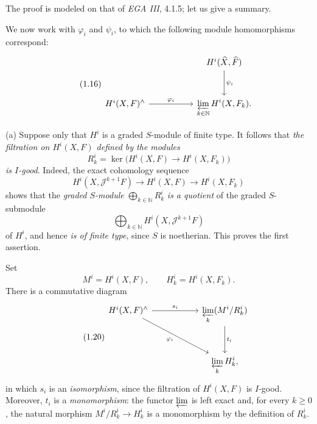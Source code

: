 \documentclass[11pt,a4paper,oneside]{book}
\theoremstyle{plain}
\theoremstyle{definition}
\theoremstyle{remark}
\begin{document}
The proof is modeled on that of \emph{EGA III}, 4.1.5; let us give a summary.

We now work with $\varphi_i$ and $\psi_i$, to which the following module
homomorphisms correspond:
\begin{equation}
\tag{1.16}\label{eq:IX.1.16}
\begin{tikzcd}[column sep=5.2em,row sep=3.0em]
& H^i(\widehat X,\widehat F)
    \arrow[d,"\psi_i"] \\
H^i(X,F)^{\wedge}
    \arrow[r,"\varphi_i"]
& \displaystyle\varprojlim_{k\in\mathbb N}H^i(X,F_k).
\end{tikzcd}
\end{equation}

\noindent\textup{(a)} Suppose only that $H^i$ is a graded $S$-module of finite
type. It follows that \emph{the filtration on $H^i(X,F)$ defined by the
modules}
\begin{equation}
\tag{1.17}\label{eq:IX.1.17}
R_k^i=\ker\bigl(H^i(X,F)\longrightarrow H^i(X,F_k)\bigr)
\end{equation}
\emph{is $I$-good}. Indeed, the exact cohomology sequence
\begin{equation}
\tag{1.18}\label{eq:IX.1.18}
H^i(X,\mathcal J^{k+1}F)\longrightarrow H^i(X,F)
  \longrightarrow H^i(X,F_k)
\end{equation}
shows that the \emph{graded $S$-module}
$\bigoplus_{k\in\mathbb N}R_k^i$ \emph{is a quotient} of the graded
$S$-submodule
\[
\bigoplus_{k\in\mathbb N}H^i(X,\mathcal J^{k+1}F)
\]
of $H^i$, and hence \emph{is of finite type}, since $S$ is noetherian. This
proves the first assertion.

Set
\begin{equation}
\tag{1.19}\label{eq:IX.1.19}
M^i=H^i(X,F),\qquad H_k^i=H^i(X,F_k).
\end{equation}
There is a commutative diagram
\begin{equation}
\tag{1.20}\label{eq:IX.1.20}
\begin{tikzcd}[column sep=5.5em,row sep=3.2em]
H^i(X,F)^{\wedge}
  \arrow[r,"s_i"]
  \arrow[dr,"\varphi_i"']
& \displaystyle\varprojlim_k(M^i/R_k^i)
  \arrow[d,"t_i"] \\
& \displaystyle\varprojlim_k H_k^i,
\end{tikzcd}
\end{equation}
in which $s_i$ is an \emph{isomorphism}, since the filtration of $H^i(X,F)$
is $I$-good. Moreover, $t_i$ is a \emph{monomorphism}: the functor
$\varprojlim$ is left exact and, for every $k\geq 0$, the natural morphism
$M^i/R_k^i\longrightarrow H_k^i$ is a monomorphism by the definition of
$R_k^i$.
\end{document}
